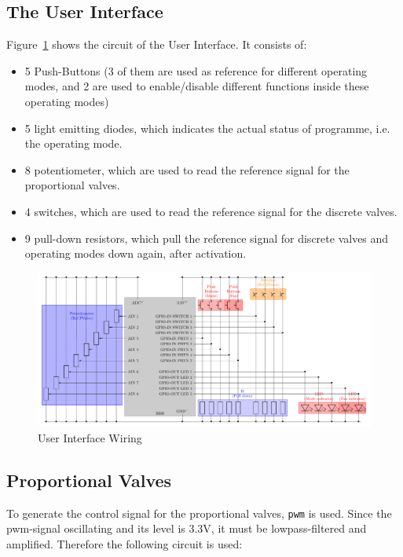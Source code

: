 \documentclass[
	fontsize=10pt
	paper=a4
]{scrartcl}
\begin{document}
\subsection{The User Interface}

Figure~\ref{fig:hui_circuit} shows the circuit of the User Interface. 
It consists of:
\begin{itemize}
	\item 5 Push-Buttons (3 of them are used as reference for different operating modes, and 2 are used to enable/disable different functions inside these operating modes)
	\item 5 light emitting diodes, which indicates the actual status of programme, i.e. the operating mode.
	\item 8 potentiometer, which are used to read the reference signal for the proportional valves.
	\item 4 switches, which are used to read the reference signal for the discrete valves.
	\item 9 pull-down resistors, which pull the reference signal for discrete valves and operating modes down again, after activation.
\end{itemize}

\begin{figure}[h!]
\begin{center}
\includegraphics[width=.98\textwidth]{Images/circuit_HUI/circuit_HUI.pdf}
\caption{User Interface Wiring}
\label{fig:hui_circuit}
\end{center}
\end{figure}


\subsection{Proportional Valves}

To generate the control signal for the proportional valves, \texttt{pwm} is used.
Since the pwm-signal oscillating and its level is 3.3V, it must be lowpass-filtered and amplified.
Therefore the following circuit is used:
\end{document}
